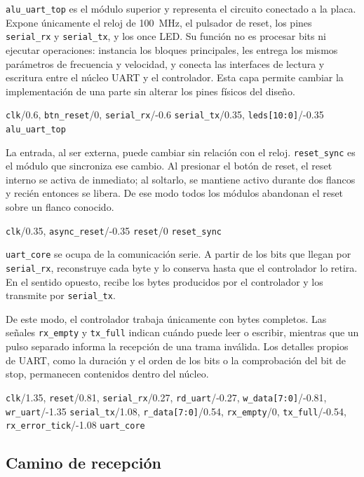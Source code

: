 \texttt{alu\_uart\_top} es el módulo superior y representa el circuito conectado
a la placa. Expone únicamente el reloj de \SI{100}{\mega\hertz}, el pulsador de
reset, los pines \texttt{serial\_rx} y \texttt{serial\_tx}, y los once LED. Su
función no es procesar bits ni ejecutar operaciones: instancia los bloques
principales, les entrega los mismos parámetros de frecuencia y velocidad, y
conecta las interfaces de lectura y escritura entre el núcleo UART y el
controlador. Esta capa permite cambiar la implementación de una parte
sin alterar
los pines físicos del diseño.

{{\texttt{clk}}/0.6,
  {\texttt{btn\_reset}}/0,
{\texttt{serial\_rx}}/-0.6}
{{\texttt{serial\_tx}}/0.35,
{\texttt{leds[10:0]}}/-0.35}
{\texttt{alu\_uart\_top}}

La entrada, al ser externa, puede cambiar sin relación con el reloj.
\texttt{reset\_sync} es el módulo que sincroniza ese cambio. Al
presionar el botón de reset, el reset interno se activa de inmediato;
al soltarlo, se mantiene activo durante dos flancos y recién entonces
se libera. De ese modo todos los módulos abandonan el reset sobre un
flanco conocido.

{{\texttt{clk}}/0.35,
{\texttt{async\_reset}}/-0.35}
{{\texttt{reset}}/0}
{\texttt{reset\_sync}}

\texttt{uart\_core} se ocupa de la comunicación serie. A partir de los bits que
llegan por \texttt{serial\_rx}, reconstruye cada byte y lo conserva hasta que el
controlador lo retira. En el sentido opuesto, recibe los bytes producidos por el
controlador y los transmite por \texttt{serial\_tx}.

De este modo, el controlador trabaja únicamente con bytes completos.
Las señales \texttt{rx\_empty} y \texttt{tx\_full} indican cuándo
puede leer o escribir, mientras que un pulso separado informa la
recepción de una trama inválida. Los detalles propios de UART, como
la duración y el orden de los bits o la comprobación del bit de stop,
permanecen contenidos dentro del núcleo.

{{\texttt{clk}}/1.35,
  {\texttt{reset}}/0.81,
  {\texttt{serial\_rx}}/0.27,
  {\texttt{rd\_uart}}/-0.27,
  {\texttt{w\_data[7:0]}}/-0.81,
{\texttt{wr\_uart}}/-1.35}
{{\texttt{serial\_tx}}/1.08,
  {\texttt{r\_data[7:0]}}/0.54,
  {\texttt{rx\_empty}}/0,
  {\texttt{tx\_full}}/-0.54,
{\texttt{rx\_error\_tick}}/-1.08}
{\texttt{uart\_core}}

\subsection{Camino de recepción}

